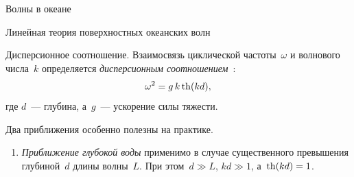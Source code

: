 \begin{chapter}{Волны в океане}
\begin{section}{Линейная теория поверхностных океанских волн}
\begin{paragraph}{Дисперсионное соотношение.}
%
Взаимосвязь циклической частоты~$\omega$ 
и волнового числа~$k$ определяется
\emph{дисперсионным соотношением}~\cite[\S{228}]{Lamb:1945}:
\begin{equation}\label{eq:16.3}
 \omega ^{2} = g \, k \mathop{\mathrm{th}}\nolimits (k d),
\end{equation}
где $d$~--- глубина, а~$g$~--- ускорение силы тяжести.
%

Два приближения особенно полезны на практике.
%
\begin{enumerate}
\item \emph{Приближение глубокой воды} применимо в случае существенного
превышения глубиной~$d$ длины волны~$L$. При этом~$d \gg L$,
$kd \gg 1$, а~$\mathop{\mathrm{th}}\nolimits (kd) = 1$.
%


\end{enumerate}
\end{paragraph}
\end{section}
\end{chapter}
